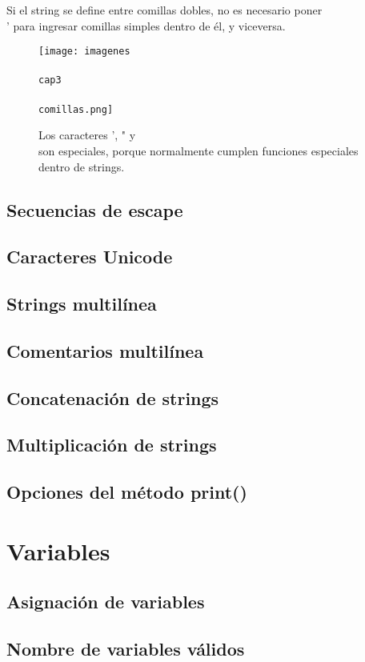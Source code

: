 \documentclass{article}
\begin{document}
        Si el string se define entre comillas dobles, no es necesario poner \\' para ingresar comillas simples dentro de él, y viceversa.

        \begin{figure}[ht!]
          \texttt{[image: imagenes\\\\cap3\\\\comillas.png]}
          \caption{Los caracteres ', " y \\ son especiales, porque normalmente cumplen funciones especiales dentro de strings.}
        \end{figure}

      \subsection{Secuencias de escape}
      \subsection{Caracteres Unicode}
      \subsection{Strings multilínea}
      \subsection{Comentarios multilínea}
      \subsection{Concatenación de strings}
      \subsection{Multiplicación de strings}
      \subsection{Opciones del método print()}
    
    \section{Variables}

      \subsection{Asignación de variables}
      \subsection{Nombre de variables válidos}
\end{document}
